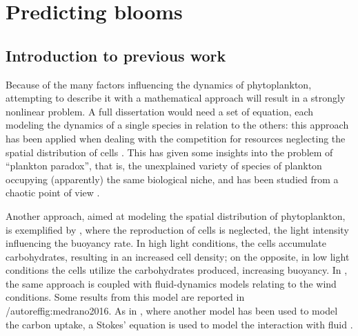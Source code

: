 \section{Predicting blooms} \label{sec:previous}

\subsection{Introduction to previous work} \label{sec:previous_intro}
Because of the many factors influencing the dynamics of phytoplankton, attempting to describe it with a mathematical approach will result in a strongly nonlinear problem. A full dissertation would need a set of equation, each modeling the dynamics of a single species in relation to the others: this approach has been applied when dealing with the competition for resources neglecting the spatial distribution of cells \autocite{Leon1975CompetitionResources}. This has given some insights into the problem of ``plankton paradox'', that is, the unexplained variety of species of plankton occupying (apparently) the same biological niche, and has been studied from a chaotic point of view \autocite{Huisman2002OscillationsResources}. 

Another approach, aimed at modeling the spatial distribution of phytoplankton, is exemplified by \autocite{visser1997modelling}, where the reproduction of cells is neglected, the light intensity influencing the buoyancy rate. In high light conditions, the cells accumulate carbohydrates, resulting in an increased cell density; on the opposite, in low light conditions the cells utilize the carbohydrates produced, increasing buoyancy. In \autocite{medrano2013coupling}, the same approach is coupled with fluid-dynamics models relating to the wind conditions. Some results from this model are reported in /autoref{fig:medrano2016}. As in \autocite{howard1996new}, where another model has been used to model the carbon uptake, a Stokes' equation is used to model the interaction with fluid \autocite[chapter 4]{berg1993random}.

